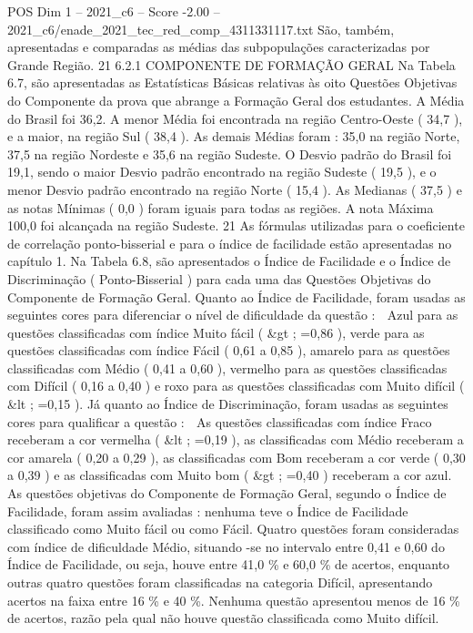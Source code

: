 \begin{textsample}{POS Dim 1 – 2021\_c6 – Score -2.00 – 2021\_c6/enade\_2021\_tec\_red\_comp\_4311331117.txt}
São, também, apresentadas e comparadas as médias das subpopulações caracterizadas por Grande Região. 21 6.2.1 COMPONENTE DE FORMAÇÃO GERAL Na Tabela 6.7, são apresentadas as Estatísticas Básicas relativas às oito Questões Objetivas do Componente da prova que abrange a Formação Geral dos estudantes.
A Média do Brasil foi 36,2.
A menor Média foi encontrada na região Centro-Oeste ( 34,7 ), e a maior, na região Sul ( 38,4 ).
As demais Médias foram : 35,0 na região Norte, 37,5 na região Nordeste e 35,6 na região Sudeste.
O Desvio padrão do Brasil foi 19,1, sendo o maior Desvio padrão encontrado na região Sudeste ( 19,5 ), e o menor Desvio padrão encontrado na região Norte ( 15,4 ).
As Medianas ( 37,5 ) e as notas Mínimas ( 0,0 ) foram iguais para todas as regiões.
A nota Máxima 100,0 foi alcançada na região Sudeste. 21 As fórmulas utilizadas para o coeficiente de correlação ponto-bisserial e para o índice de facilidade estão apresentadas no capítulo 1.
Na Tabela 6.8, são apresentados o Índice de Facilidade e o Índice de Discriminação ( Ponto-Bisserial ) para cada uma das Questões Objetivas do Componente de Formação Geral.
Quanto ao Índice de Facilidade, foram usadas as seguintes cores para diferenciar o nível de dificuldade da questão :  Azul para as questões classificadas com índice Muito fácil ( \&gt ; =0,86 ), verde para as questões classificadas com índice Fácil ( 0,61 a 0,85 ), amarelo para as questões classificadas com Médio ( 0,41 a 0,60 ), vermelho para as questões classificadas com Difícil ( 0,16 a 0,40 ) e roxo para as questões classificadas com Muito difícil ( \&lt ; =0,15 ).
Já quanto ao Índice de Discriminação, foram usadas as seguintes cores para qualificar a questão :  As questões classificadas com índice Fraco receberam a cor vermelha ( \&lt ; =0,19 ), as classificadas com Médio receberam a cor amarela ( 0,20 a 0,29 ), as classificadas com Bom receberam a cor verde ( 0,30 a 0,39 ) e as classificadas com Muito bom ( \&gt ; =0,40 ) receberam a cor azul.
As questões objetivas do Componente de Formação Geral, segundo o Índice de Facilidade, foram assim avaliadas : nenhuma teve o Índice de Facilidade classificado como Muito fácil ou como Fácil.
Quatro questões foram consideradas com índice de dificuldade Médio, situando -se no intervalo entre 0,41 e 0,60 do Índice de Facilidade, ou seja, houve entre 41,0 \% e 60,0 \% de acertos, enquanto outras quatro questões foram classificadas na categoria Difícil, apresentando acertos na faixa entre 16 \% e 40 \%.
Nenhuma questão apresentou menos de 16 \% de acertos, razão pela qual não houve questão classificada como Muito difícil.

\end{textsample}
